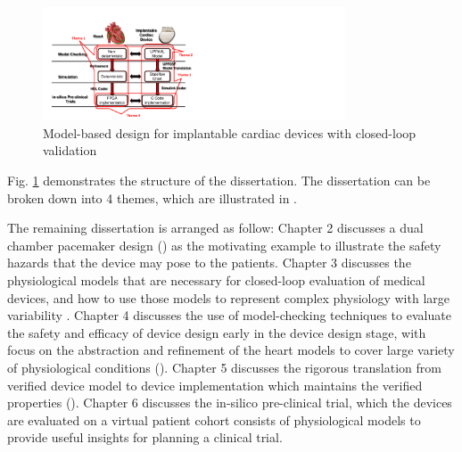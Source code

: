 \begin{figure}[t]
		\centering
		\includegraphics[width=0.8\textwidth]{figs/model_based_b.pdf}
		\caption{\small Model-based design for implantable cardiac devices with closed-loop validation}
		\label{fig:modeling_overview}
\end{figure}

Fig. \ref{fig:modeling_overview} demonstrates the structure of the dissertation.
The dissertation can be broken down into 4 themes, which are illustrated in . 

The remaining dissertation is arranged as follow:
Chapter 2 discusses a dual chamber pacemaker design (\cite{compass}) as the motivating example to illustrate the safety hazards that the device may pose to the patients.
Chapter 3 discusses the physiological models that are necessary for closed-loop evaluation of medical devices, and how to use those models to represent complex physiology with large variability \cite{VHM_proc}.
Chapter 4 discusses the use of model-checking techniques to evaluate the safety and efficacy of device design early in the device design stage, with focus on the abstraction and refinement of the heart models to cover large variety of physiological conditions (\cite{STTT13}).
Chapter 5 discusses the rigorous translation from verified device model to device implementation which maintains the verified properties (\cite{RTAS12}).
Chapter 6 discusses the in-silico pre-clinical trial, which the devices are evaluated on a virtual patient cohort consists of physiological models to provide useful insights for planning a clinical trial. 


